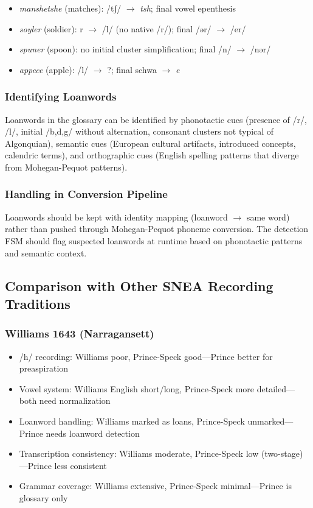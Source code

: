 \begin{itemize}
  \item \textit{manshetshe} (matches): /tʃ/ $\rightarrow$ \textit{tsh};
    final vowel epenthesis
  \item \textit{soyler} (soldier): r $\rightarrow$ /l/ (no native /r/);
    final /ər/ $\rightarrow$ /er/
  \item \textit{spuner} (spoon): no initial cluster simplification;
    final /n/ $\rightarrow$ /nər/
  \item \textit{appece} (apple): /l/ $\rightarrow$ ?; final schwa
    $\rightarrow$ \textit{e}
\end{itemize}

\subsubsection{Identifying Loanwords}

Loanwords in the glossary can be identified by phonotactic cues (presence of
/r/, /l/, initial /b,d,g/ without alternation, consonant clusters not typical
of Algonquian), semantic cues (European cultural artifacts, introduced
concepts, calendric terms), and orthographic cues (English spelling patterns
that diverge from Mohegan-Pequot patterns).

\subsubsection{Handling in Conversion Pipeline}

Loanwords should be kept with identity mapping (loanword $\rightarrow$ same
word) rather than pushed through Mohegan-Pequot phoneme conversion. The
detection FSM should flag suspected loanwords at runtime based on phonotactic
patterns and semantic context.

\subsection{Comparison with Other SNEA Recording Traditions}

\subsubsection{Williams 1643 (Narragansett)}

\begin{itemize}
  \item /h/ recording: Williams poor, Prince-Speck good---Prince better for
    preaspiration
  \item Vowel system: Williams English short/long, Prince-Speck more
    detailed---both need normalization
  \item Loanword handling: Williams marked as loans, Prince-Speck
    unmarked---Prince needs loanword detection
  \item Transcription consistency: Williams moderate, Prince-Speck low
    (two-stage)---Prince less consistent
  \item Grammar coverage: Williams extensive, Prince-Speck minimal---Prince
    is glossary only
\end{itemize}

